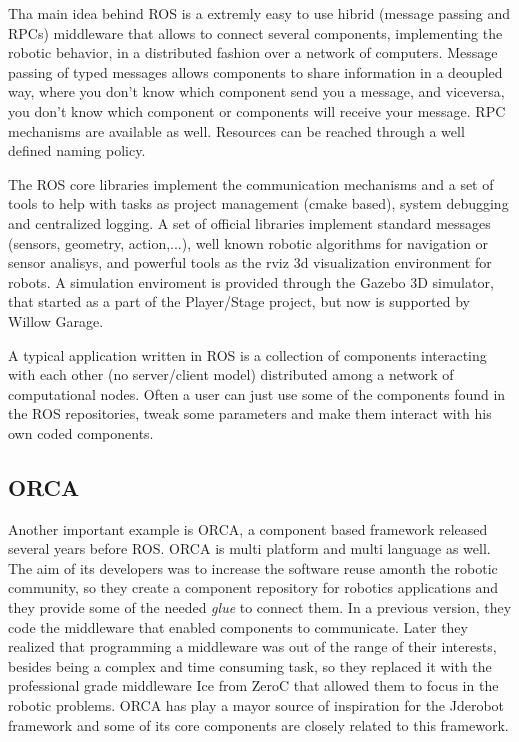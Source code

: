 \documentclass[twocolumn]{svjour3}          %
\begin{document}
Tha main idea behind ROS is a extremly easy to use hibrid (message passing and RPCs) middleware that allows to connect several components, implementing the robotic behavior, in a distributed fashion over a network of computers. Message passing of typed messages allows components to share information in a deoupled way, where you don't know which component send you a message, and viceversa, you don't know which component or components will receive your message. RPC mechanisms are available as well. Resources can be reached through a well defined naming policy.

The ROS core libraries implement the communication mechanisms and a set of tools to help with tasks as project management (cmake based), system
debugging and centralized logging. A set of official libraries implement standard messages (sensors, geometry, action,...), well known robotic algorithms for navigation or sensor analisys, and powerful tools as the rviz 3d visualization environment for robots. A simulation enviroment is provided through the Gazebo 3D simulator, that started as a part of the Player/Stage project, but now is supported by Willow Garage.

A typical application written in ROS is a collection of components interacting with each other (no server/client model) distributed among a network of computational nodes. Often a user can just use some of the components found in the ROS repositories, tweak some parameters and make them interact with his own coded components.

\subsection{ORCA}
Another important example is ORCA, a component based framework released several years before ROS. ORCA is multi platform and multi language as well. The aim of its developers was to increase the software reuse amonth the robotic community, so they create a component repository for robotics applications and they provide some of the needed \textit{glue} to connect them. In a previous version, they code the middleware that enabled components to communicate. Later they realized that programming a middleware was out of the range of their interests, besides being a complex and time consuming task, so they replaced it with the professional grade middleware Ice from ZeroC \cite{henning04} that allowed them to focus in the robotic problems. ORCA has play a mayor source of inspiration for the Jderobot framework and some of its core components are closely related to this framework.
\end{document}
